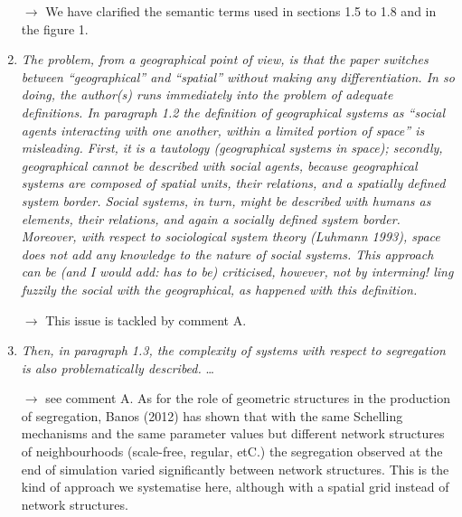 \documentclass[11pt,a4paper,sans]{moderncv}        %
\begin{document}
\begin{enumerate}
   $\rightarrow$ We have clarified the semantic terms used in sections 1.5 to 1.8 and in the figure 1.
   
 

\medskip

  \item \textit{The problem, from a geographical point of view, is that the paper switches between “geographical” and “spatial” without making any differentiation. In so doing, the author(s) runs immediately into the problem of adequate definitions. In paragraph 1.2 the definition of geographical systems as “social agents interacting with one another, within a limited portion of space” is misleading. First, it is a tautology (geographical systems in space); secondly, geographical cannot be described with social agents, because geographical systems are composed of spatial units, their relations, and a spatially defined system border. Social systems, in turn, might be described with humans as elements, their relations, and again a socially defined system border. Moreover, with respect to sociological system theory (Luhmann 1993), space does not add any knowledge to the nature of social systems. This approach can be (and I would add: has to be) criticised, however, not by interming! ling fuzzily the social with the geographical, as happened with this definition.} 
 
 $\rightarrow$ This issue is tackled by comment A.
 
 \medskip

  

  \item \textit{Then, in paragraph 1.3, the complexity of systems with respect to segregation is also problematically described.} \ldots
  
  $\rightarrow$ see comment A. As for the role of geometric structures in the production of segregation, Banos (2012) has shown that with the same Schelling mechanisms and the same parameter values but different network structures of neighbourhoods (scale-free, regular, etC.) the segregation observed at the end of simulation varied significantly between network structures. This is the kind of approach we systematise here, although with a spatial grid instead of network structures.


\end{enumerate}
\end{document}
